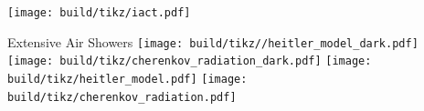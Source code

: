 \begin{frame}
  \texttt{[image: build/tikz/iact.pdf]}
\end{frame}

\begin{frame}{Extensive Air Showers}
    {%
    \texttt{[image: build/tikz//heitler\_model\_dark.pdf]}
    \texttt{[image: build/tikz/cherenkov\_radiation\_dark.pdf]}
    }
    {%
    \texttt{[image: build/tikz/heitler\_model.pdf]}
    \texttt{[image: build/tikz/cherenkov\_radiation.pdf]}
    }
\end{frame}

